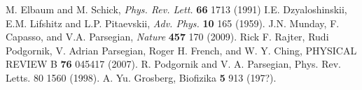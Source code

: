 \documentclass[onecolumn,letterpaper,amsmath,amssymb,floatfix,aps,superscriptaddress]{revtex4}
\begin{document}
\begin{thebibliography}{99}
 M. Elbaum and M. Schick, {\sl Phys. Rev. Lett.} {\bf 66} 1713 (1991)
 I.E. Dzyaloshinskii, E.M. Lifshitz and L.P. Pitaevskii, {\sl Adv. Phys.} {\bf 10} 165 (1959).
 J.N. Munday, F. Capasso, and V.A. Parsegian, {\sl Nature} {\bf 457} 170 (2009).
Rick F. Rajter, Rudi Podgornik, V. Adrian Parsegian, Roger H. French, and W. Y. Ching, PHYSICAL REVIEW B {\bf 76} 045417 (2007).
R. Podgornik and V. A. Parsegian, Phys. Rev. Letts. {\rm 80} 1560 (1998).
A. Yu. Grosberg,  Biofizika  {\bf 5} 913 (197?).

\end{thebibliography}
\end{document}
